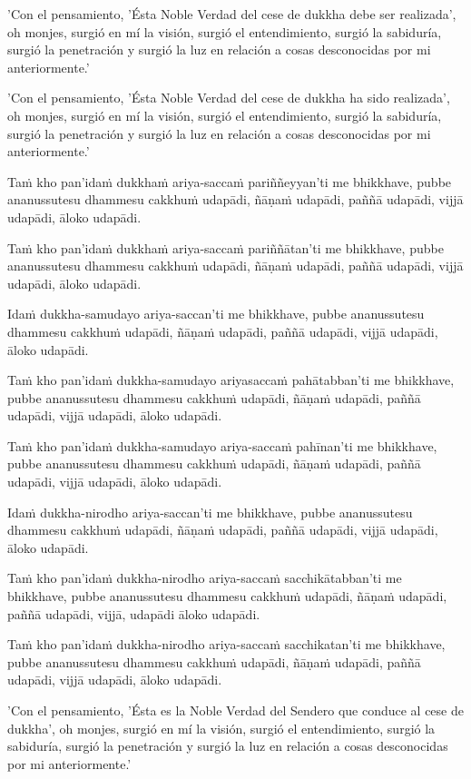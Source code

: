 \enlargethispage*{2\baselineskip}

'Con el pensamiento, 'Ésta Noble Verdad del cese de dukkha debe ser realizada', oh monjes, surgió en mí la visión, surgió el entendimiento, surgió la sabiduría, surgió la penetración y surgió la luz en relación a cosas desconocidas por mi anteriormente.'

'Con el pensamiento, 'Ésta Noble Verdad del cese de dukkha ha sido realizada', oh monjes, surgió en mí la visión, surgió el entendimiento, surgió la sabiduría, surgió la penetración y surgió la luz en relación a cosas desconocidas por mi anteriormente.'


\clearpage

\paliText
\markboth{\paliTitle}{\rightmark}

Taṁ kho pan'idaṁ dukkhaṁ ariya-saccaṁ pariññeyyan'ti me bhikkhave, pubbe
ananussutesu dhammesu cakkhuṁ udapādi, ñāṇaṁ udapādi, paññā udapādi,
vijjā udapādi, āloko udapādi.

Taṁ kho pan'idaṁ dukkhaṁ ariya-saccaṁ pariññātan'ti me bhikkhave, pubbe
ananussutesu dhammesu cakkhuṁ udapādi, ñāṇaṁ udapādi, paññā udapādi,
vijjā udapādi, āloko udapādi.

Idaṁ dukkha-samudayo ariya-saccan'ti me bhikkhave, pubbe ananussutesu
dhammesu cakkhuṁ udapādi, ñāṇaṁ udapādi, paññā udapādi, vijjā udapādi,
āloko udapādi.

Taṁ kho pan'idaṁ dukkha-samudayo ariyasaccaṁ pahātabban'ti me bhikkhave,
pubbe ananussutesu dhammesu cakkhuṁ udapādi, ñāṇaṁ udapādi, paññā
udapādi, vijjā udapādi, āloko udapādi.

Taṁ kho pan'idaṁ dukkha-samudayo ariya-saccaṁ pahīnan'ti me bhikkhave, pubbe
ananussutesu dhammesu cakkhuṁ udapādi, ñāṇaṁ udapādi, paññā udapādi,
vijjā udapādi, āloko udapādi.

Idaṁ dukkha-nirodho ariya-saccan'ti me bhikkhave, pubbe ananussutesu
dhammesu cakkhuṁ udapādi, ñāṇaṁ udapādi, paññā udapādi, vijjā udapādi,
āloko udapādi.

Taṁ kho pan'idaṁ dukkha-nirodho ariya-saccaṁ sacchikātabban'ti me bhikkhave,
pubbe ananussutesu dhammesu cakkhuṁ udapādi, ñāṇaṁ udapādi, paññā
udapādi, vijjā, udapādi āloko udapādi.

Taṁ kho pan'idaṁ dukkha-nirodho ariya-saccaṁ sacchikatan'ti me bhikkhave,
pubbe ananussutesu dhammesu cakkhuṁ udapādi, ñāṇaṁ udapādi, paññā
udapādi, vijjā udapādi, āloko udapādi.

\clearpage

\englishText
\markboth{\englishTitle}{\rightmark}
'Con el pensamiento, 'Ésta es la Noble Verdad del Sendero que conduce al cese de dukkha', oh monjes, surgió en mí la visión, surgió el entendimiento, surgió la sabiduría, surgió la penetración y surgió la luz en relación a cosas desconocidas por mi anteriormente.'


